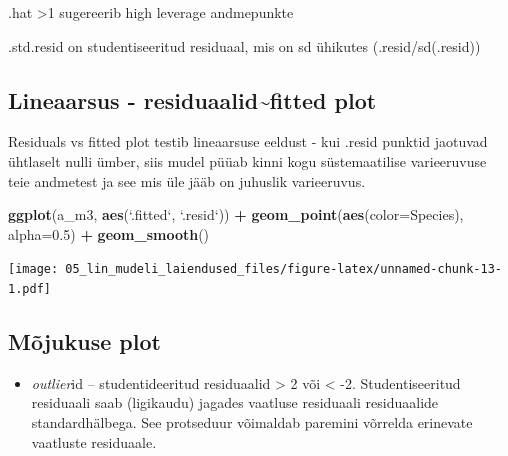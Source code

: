 \documentclass[]{book}
\newenvironment{Shaded}{\begin{snugshade}}{\end{snugshade}}
\newcommand{\DataTypeTok}[1]{\textcolor[rgb]{0.13,0.29,0.53}{#1}}
\newcommand{\FloatTok}[1]{\textcolor[rgb]{0.00,0.00,0.81}{#1}}
\newcommand{\KeywordTok}[1]{\textcolor[rgb]{0.13,0.29,0.53}{\textbf{#1}}}
\newcommand{\NormalTok}[1]{#1}
\newcommand{\OperatorTok}[1]{\textcolor[rgb]{0.81,0.36,0.00}{\textbf{#1}}}
\newcommand{\StringTok}[1]{\textcolor[rgb]{0.31,0.60,0.02}{#1}}
\providecommand{\tightlist}{%
  \setlength{\itemsep}{0pt}\setlength{\parskip}{0pt}}
\begin{document}
.hat \textgreater{}1 sugereerib high leverage andmepunkte

.std.resid on studentiseeritud residuaal, mis on sd ühikutes (.resid/sd(.resid))

\hypertarget{lineaarsus---residuaalidfitted-plot}{%
\subsection*{Lineaarsus - residuaalid\textasciitilde{}fitted plot}\label{lineaarsus---residuaalidfitted-plot}}

Residuals vs fitted plot testib lineaarsuse eeldust - kui .resid punktid jaotuvad ühtlaselt nulli ümber, siis mudel püüab kinni kogu süstemaatilise varieeruvuse teie andmetest ja see mis üle jääb on juhuslik varieeruvus.

\begin{Shaded}
\begin{Highlighting}[]
\KeywordTok{ggplot}\NormalTok{(a_m3, }\KeywordTok{aes}\NormalTok{(}\StringTok{`}\DataTypeTok{.fitted}\StringTok{`}\NormalTok{, }\StringTok{`}\DataTypeTok{.resid}\StringTok{`}\NormalTok{)) }\OperatorTok{+}\StringTok{ }
\StringTok{  }\KeywordTok{geom_point}\NormalTok{(}\KeywordTok{aes}\NormalTok{(}\DataTypeTok{color=}\NormalTok{Species), }\DataTypeTok{alpha=}\FloatTok{0.5}\NormalTok{) }\OperatorTok{+}\StringTok{ }
\StringTok{  }\KeywordTok{geom_smooth}\NormalTok{()}
\end{Highlighting}
\end{Shaded}

\texttt{[image: 05\_lin\_mudeli\_laiendused\_files/figure-latex/unnamed-chunk-13-1.pdf]}

\hypertarget{mojukuse-plot}{%
\subsection*{Mõjukuse plot}\label{mojukuse-plot}}

\begin{itemize}
\tightlist
\item
  \emph{outlier}id -- studentideeritud residuaalid \textgreater{} 2 või \textless{} -2. Studentiseeritud residuaali saab (ligikaudu) jagades vaatluse residuaali residuaalide standardhälbega. See protseduur võimaldab paremini võrrelda erinevate vaatluste residuaale.
\end{itemize}
\end{document}
